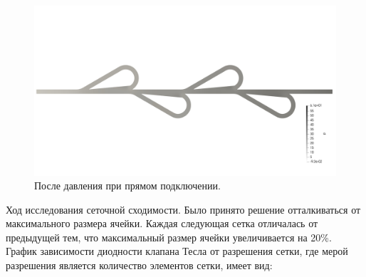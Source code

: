 \documentclass[10pt,a4paper]{book}
\begin{document}
        \begin{figure}[H]
            \centering
            \includegraphics[width = 1\linewidth]{PFieldsDirect}
            \caption{После давления при прямом подключении.}
            \label{fig:PFieldsDirect}
        \end{figure}
         
            
        Ход исследования сеточной сходимости. Было принято решение отталкиваться от максимального размера ячейки. Каждая следующая сетка отличалась от предыдущей тем, что максимальный размер ячейки увеличивается на 20\%. График зависимости диодности клапана Тесла от разрешения сетки, где мерой разрешения является количество элементов сетки, имеет вид:
        \\
        
\end{document}
